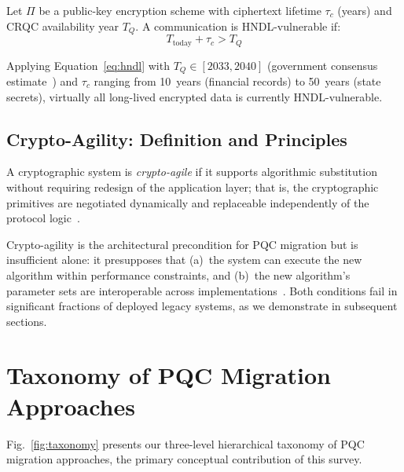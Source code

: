 \documentclass[journal]{IEEEtran}
\begin{document}
\begin{definition}
Let $\Pi$ be a public-key encryption scheme with ciphertext lifetime
$\tau_c$ (years) and CRQC availability year $T_Q$. A communication is
HNDL-vulnerable if:
\begin{equation}
  T_{\text{today}} + \tau_c > T_Q
  \label{eq:hndl}
\end{equation}
\end{definition}

Applying Equation~\eqref{eq:hndl} with $T_Q \in [2033, 2040]$ (government
consensus estimate~\cite{odni2023atr}) and $\tau_c$ ranging from 10~years
(financial records) to 50~years (state secrets), virtually all long-lived
encrypted data is currently HNDL-vulnerable.

\subsection{Crypto-Agility: Definition and Principles}

\begin{definition}
A cryptographic system is \emph{crypto-agile} if it supports algorithmic
substitution without requiring redesign of the application layer; that is,
the cryptographic primitives are negotiated dynamically and replaceable
independently of the protocol logic~\cite{hoffman2022cryptoagility}.
\end{definition}

Crypto-agility is the architectural precondition for PQC migration but is
insufficient alone: it presupposes that (a)~the system can execute the new
algorithm within performance constraints, and (b)~the new algorithm's parameter
sets are interoperable across implementations~\cite{paterson2016reactive}.
Both conditions fail in significant fractions of deployed legacy systems, as
we demonstrate in subsequent sections.

\FloatBarrier
\section{Taxonomy of PQC Migration Approaches}
\label{sec:taxonomy}

Fig.~\ref{fig:taxonomy} presents our three-level hierarchical taxonomy of PQC
migration approaches, the primary conceptual contribution of this survey.
\end{document}
